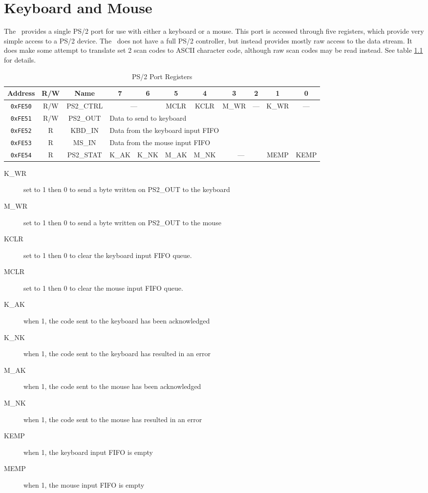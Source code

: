 \chapter{Keyboard and Mouse}

The \jr\ provides a single PS/2 port for use with either a keyboard or a mouse. This port is accessed through five registers, which provide very simple access to a PS/2 device. The \jr\ does not have a full PS/2 controller, but instead provides mostly raw access to the data stream. It does make some attempt to translate set 2 scan codes to ASCII character code, although raw scan codes may be read instead. See table \ref{tab:ps2_reg} for details.

\begin{table}[ht]
    \begin{center}
        \begin{tabular}{|c|c|c|c|c|c|c|c|c|c|c|} \hline
            Address & R/W & Name & 7 & 6 & 5 & 4 & 3 & 2 & 1 & 0 \\\hline\hline
            \verb+0xFE50+ & R/W & PS2\_CTRL & \multicolumn{2}{|c|}{---} & MCLR & KCLR & M\_WR & --- & K\_WR & --- \\\hline
            \verb+0xFE51+ & R/W & PS2\_OUT & \multicolumn{8}{|l|}{Data to send to keyboard} \\ \hline
            \verb+0xFE52+ & R & KBD\_IN & \multicolumn{8}{|l|}{Data from the keyboard input FIFO} \\ \hline
            \verb+0xFE53+ & R & MS\_IN & \multicolumn{8}{|l|}{Data from the mouse input FIFO} \\ \hline
            \verb+0xFE54+ & R & PS2\_STAT & K\_AK & K\_NK & M\_AK & M\_NK & \multicolumn{2}{|c|}{---} & MEMP & KEMP \\ \hline
        \end{tabular}
    \end{center}
    \caption{PS/2 Port Registers}
    \label{tab:ps2_reg}
\end{table}

\begin{description}
    \item[K\_WR] set to 1 then 0 to send a byte written on PS2\_OUT to the keyboard
    \item[M\_WR] set to 1 then 0 to send a byte written on PS2\_OUT to the mouse
    \item[KCLR] set to 1 then 0 to clear the keyboard input FIFO queue.
    \item[MCLR] set to 1 then 0 to clear the mouse input FIFO queue. 
    \item[K\_AK] when 1, the code sent to the keyboard has been acknowledged
    \item[K\_NK] when 1, the code sent to the keyboard has resulted in an error
    \item[M\_AK] when 1, the code sent to the mouse has been acknowledged
    \item[M\_NK] when 1, the code sent to the mouse has resulted in an error
    \item[KEMP] when 1, the keyboard input FIFO is empty
    \item[MEMP] when 1, the mouse input FIFO is empty 
\end{description}

